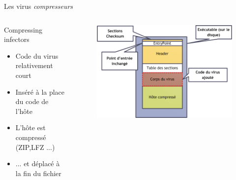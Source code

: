 \documentclass{beamer}
\begin{document}
\begin{frame}{Les virus \textit{compresseurs}}
\begin{columns}[t]
\begin{column}{4cm}
\begin{exampleblock}{Compressing infectors}
\begin{itemize}
\item Code du virus relativement court
\item Inséré à la place du code de l'hôte
\item L'hôte est compressé (ZIP,LFZ ...)
\item ... et déplacé à la fin du fichier 
\end{itemize}
\end{exampleblock}
\end{column}
\begin{column}{6cm}
\begin{figure}[!ht]
\includegraphics[scale=0.32]{zip.png}
\center
\end{figure}
\end{column}
\end{columns}
\end{frame}
\end{document}
